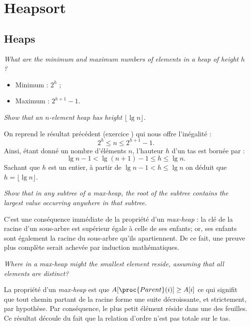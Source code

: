 \section{Heapsort}

\subsection{Heaps}

\begin{description}
   \textit{What are the minimum and maximum numbers of elements in a heap of height $h$?} %
    \begin{ex}
      \begin{itemize}
        \item Minimum : $2^{h}$ ;
        \item Maximum : $2^{h+1}-1$.
      \end{itemize}
    \end{ex} 
   \textit{Show that an $n$-element heap has height $\lfloor \lg n \rfloor$.}
    \begin{ex}
      On reprend le r\'esultat pr\'ec\'edent (exercice )  qui nous offre l'in\'egalit\'e :
      \[2^h \le n \le 2^{h+1}-1.\]
      Ainsi, \'etant donn\'e un nombre d'\'el\'ements $n$, l'hauteur $h$ d'un tas est born\'ee par :
      \[\lg n -1  < \lg(n+1)-1 \le h \le \lg n.\]
      Sachant que $h$ est un entier, \`a partir de $\lg n - 1 < h \le \lg n$ on d\'eduit que $h = \lfloor \lg n \rfloor$.
    \end{ex}
   \textit{Show that in any subtree of a max-heap, the root of the subtree contains the largest value occurring anywhere in that subtree.}
    \begin{ex} %
      C'est une cons\'equence imm\'ediate de la propri\'et\'e d'un \textit{max-heap} : la cl\'e de la racine d'un sous-arbre est sup\'erieur \'egale \`a celle de ses enfants; or, ses enfants sont \'egalement la racine du sous-arbre qu'ils apartiennent. De ce fait, une preuve plus compl\`ete serait achev\'ee par induction math\'ematiques.
    \end{ex}
   \textit{Where in a max-heap might the smallest element reside, assuming that all elements are distinct?}
    \begin{ex}
      La propri\'et\'e d'un \textit{max-heap} est que $A[\proc{Parent}(i)] \ge A[i]$ ce qui signifit que tout chemin partant de la racine forme une suite d\'ecroissante, et strictement, par hypoth\`ese. Par cons\'equence, le plus petit \'el\'ement r\'eside dans une des feuilles. Ce r\'esultat d\'ecoule du fait que la relation d'ordre n'est pas totale sur le tas.

\end{ex}
\end{description}
